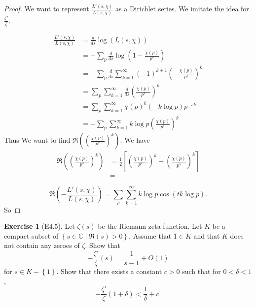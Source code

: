 \documentclass[reqno]{amsart}
\theoremstyle{definition}
\newtheorem{exercise}[theorem]{Exercise}
\theoremstyle{remark}
\begin{document}
\begin{proof}
    We want to represent
    $\frac{L' (s, \chi)}{L (s, \chi)}$ as a Dirichlet series.
    We imitate the idea for $\frac{\zeta'}{\zeta}$.

    \begin{align*}
        \frac{L'(s, \chi)}{L (s, \chi)}
        &= \frac{d}{ds} \log \left( L (s, \chi) \right) \\
        &=  - \sum_p \frac{d}{ds}
        \log \left( 1- \frac{\chi(p)}{p^{s}} \right) \\
        &= - \sum_p \frac{d}{ds} 
        \sum_{k=1}^{\infty} (-1)^{k+1} \left( - \frac{\chi(p)}{p^{s}}
        \right)^{k}\\
        &= \sum_p \sum_{k=1}^{\infty} \frac{d}{ds} 
        \left( \frac{\chi (p)}{p^{s}} \right)^{k}\\
        &= \sum_p \sum_{k=1}^{\infty} \chi(p)^{k} (-k \log p)
        p^{-sk}\\
        &= - \sum_p \sum_{k=1}^{\infty} k \log p \left( 
        \frac{\chi(p)}{p^{s}} \right)^{k}
    \end{align*}
    Thus
    We want to find 
    $\Re \left( \left( \frac{\chi(p)}{p^{s}} \right)^{k} \right) $.
    We have
    \begin{align*}
      \Re \left( \left( \frac{\chi(p)}{p^{s}} \right)^{k} \right) 
      &= \frac{1}{2} \left[ \left( \frac{\chi(p)}{p^{s}} \right)^{k} 
      + \left( \frac{\overline{\chi(p)}}{\overline{p^{s}}} \right)^{k}
  \right] \\
      &= 
    \end{align*}
    
    \[
    \Re \left( - \frac{L'(s,\chi)}{L(s,\chi)} \right) 
    = \sum_p \sum_{k=1}^{\infty} k \log p 
    \cos \left( tk \log p \right) .
    \] 
    So

\end{proof}


\begin{exercise}[E4.5]
    Let $\zeta(s)$ be the Riemann zeta function. Let
    $K$ be a compact subset of 
    $\left\{ s \in \mathbb{C}  \mid  
    \Re (s) > 0 \right\} $. Assume that
    $1 \in K$ and that $K$ does not contain any zeroes
    of $\zeta$. Show that
    \[
    - \frac{\zeta'}{\zeta}(s) = \frac{1}{s-1} + O(1)
    \] 
    for $s \in K - \left\{ 1 \right\} $. Show that there
    exists a constant $c >0$ such that for
    $0 < \delta < 1$,
    \[
    - \frac{\zeta'}{\zeta}(1+\delta) < \frac{1}{\delta} + c.
    \] 
\end{exercise}
\end{document}
